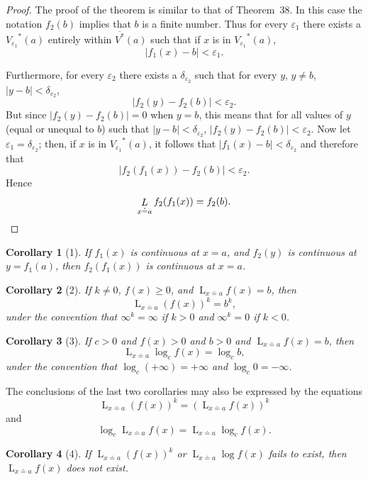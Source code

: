 \documentclass[a4paper,12pt]{book}[2004/02/16]
\providecommand{\geqq}{\geq}
\providecommand{\hyperlink}[2]{#2}
\providecommand{\hypertarget}[2]{#2}
\theoremstyle{ilemma}
\theoremstyle{itheorem}
\theoremstyle{iother}
\theoremstyle{icorollary}
\theoremstyle{numcorollary}
\newtheorem{ncorollary}{Corollary}
\theoremstyle{idefinition}
\begin{document}
\begin{proof}
The proof of the theorem is similar to that of Theorem~\hyperlink{thm38}{38}.  In this
case the notation $f_2(b)$ implies that $b$ is a finite number. Thus
for every $\varepsilon_1$ there exists a ${V_{\varepsilon_1}}^*(a)$
entirely within $\overline{V^*}(a)$ such that if $x$ is in
${V_{\varepsilon_1}}^*(a)$,
\[
  |f_1(x)-b|< \varepsilon_1.
\]

Furthermore, for every $\varepsilon_2$ there exists a
$\delta_{\varepsilon_2}$ such that for every $y$, $y \neq b$,
$|y-b|<\delta_{\varepsilon_2}$,
\[
  |f_2(y)-f_2(b)|< \varepsilon_2.
\]
But since $|f_2(y)-f_2(b)|= 0$ when $y = b$, this means that for all
values of $y$ (equal or unequal to $b$) such that $|y-b|<
\delta_{\varepsilon_2}$, $|f_2(y)-f_2(b)|< \varepsilon_2$. Now let
$\varepsilon_1 = \delta_{\varepsilon_2}$; then, if $x$ is in
${V_{\varepsilon_1}}^*(a)$, it follows that $|f_1(x)-b|<
\delta_{\varepsilon_2}$ and therefore that
\[
  |f_2(f_1(x))-f_2(b)|< \varepsilon_2.
\]
Hence
\[
  \mathop{L}_{x \doteq a} f_2(f_1(x)) = f_2(b).\qedhere
\]
\end{proof}
\begin{ncorollary}[1]\hypertarget{cor1p81}{}
If $f_1(x)$ is continuous at $x=a$, and $f_2(y)$ is continuous at
$y=f_1(a)$, then $f_2(f_1(x))$ is continuous at $x=a$.
\end{ncorollary}

\begin{ncorollary}[2]\hypertarget{cor2p81}{}
If $k \neq 0$, $f(x) \geqq 0$, and $\displaystyle \mathop{L}_{x \doteq
a} f(x) =b$, then
\[
  \mathop{L}_{x \doteq a} (f(x))^k = b^k,
\]
under the convention that $\infty^k = \infty$ if $k>0$ and
$\infty^k=0$ if $k<0$.
\end{ncorollary}

\begin{ncorollary}[3]\label{logp81}
If $c>0$ and $f(x)>0$ and $b>0$ and $\displaystyle \mathop{L}_{x
\doteq a} f(x)=b$, then
\[
  \mathop{L}_{x \doteq a} \log_c f(x) = \log_c b,
\]
under the convention that $\log_c (+\infty) = +\infty$ and $\log_c 0
=-\infty$.
\end{ncorollary}

The conclusions of the last two corollaries may also be expressed by
the equations
\[
   \mathop{L}_{x \doteq a} (f(x))^k
= (\mathop{L}_{x \doteq a} f(x))^k
\]
and
\[
  \log_c \mathop{L}_{x \doteq a} f(x)
= \mathop{L}_{x \doteq a} \log_c f(x).
\]

\begin{ncorollary}[4]
If $\displaystyle \mathop{L}_{x \doteq a} (f(x))^k$ or $\displaystyle
\mathop{L}_{x \doteq a} \log f(x)$ fails to exist, then $\displaystyle
\mathop{L}_{x \doteq a} f(x)$ does not exist.
\end{ncorollary}
\end{document}
